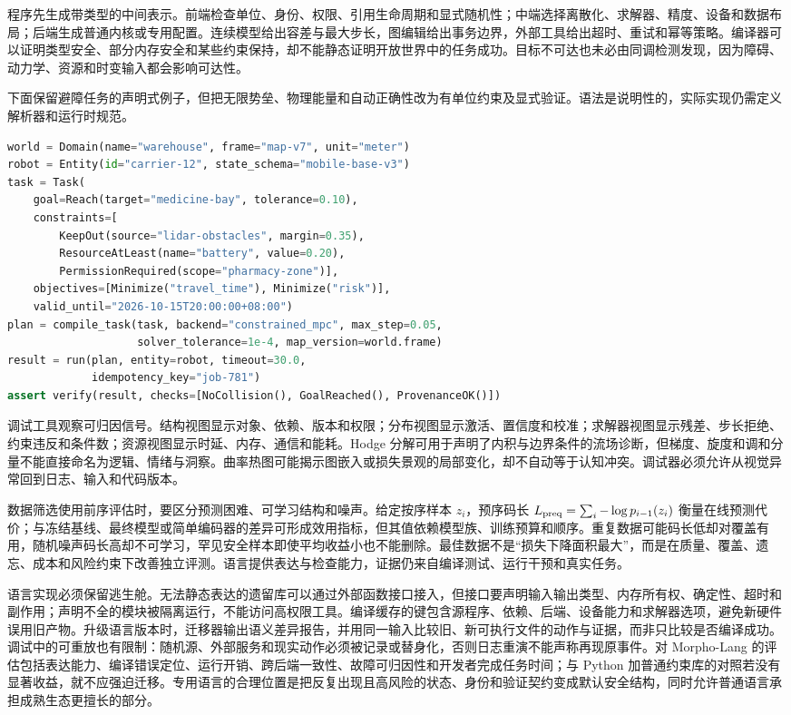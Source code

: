 程序先生成带类型的中间表示。前端检查单位、身份、权限、引用生命周期和显式随机性；中端选择离散化、求解器、精度、设备和数据布局；后端生成普通内核或专用配置。连续模型给出容差与最大步长，图编辑给出事务边界，外部工具给出超时、重试和幂等策略。编译器可以证明类型安全、部分内存安全和某些约束保持，却不能静态证明开放世界中的任务成功。目标不可达也未必由同调检测发现，因为障碍、动力学、资源和时变输入都会影响可达性。

下面保留避障任务的声明式例子，但把无限势垒、物理能量和自动正确性改为有单位约束及显式验证。语法是说明性的，实际实现仍需定义解析器和运行时规范。
\begin{lstlisting}[language=Python, caption={Morpho-Lang 参考伪代码：带版本和验证器的避障任务}]
world = Domain(name="warehouse", frame="map-v7", unit="meter")
robot = Entity(id="carrier-12", state_schema="mobile-base-v3")
task = Task(
    goal=Reach(target="medicine-bay", tolerance=0.10),
    constraints=[
        KeepOut(source="lidar-obstacles", margin=0.35),
        ResourceAtLeast(name="battery", value=0.20),
        PermissionRequired(scope="pharmacy-zone")],
    objectives=[Minimize("travel_time"), Minimize("risk")],
    valid_until="2026-10-15T20:00:00+08:00")
plan = compile_task(task, backend="constrained_mpc", max_step=0.05,
                    solver_tolerance=1e-4, map_version=world.frame)
result = run(plan, entity=robot, timeout=30.0,
             idempotency_key="job-781")
assert verify(result, checks=[NoCollision(), GoalReached(), ProvenanceOK()])
\end{lstlisting}

调试工具观察可归因信号。结构视图显示对象、依赖、版本和权限；分布视图显示激活、置信度和校准；求解器视图显示残差、步长拒绝、约束违反和条件数；资源视图显示时延、内存、通信和能耗。Hodge 分解可用于声明了内积与边界条件的流场诊断，但梯度、旋度和调和分量不能直接命名为逻辑、情绪与洞察。曲率热图可能揭示图嵌入或损失景观的局部变化，却不自动等于认知冲突。调试器必须允许从视觉异常回到日志、输入和代码版本。

数据筛选使用前序评估时，要区分预测困难、可学习结构和噪声。给定按序样本 $z_i$，预序码长 $L_{\rm preq}=\sum_i-\log p_{i-1}(z_i)$ 衡量在线预测代价；与冻结基线、最终模型或简单编码器的差异可形成效用指标，但其值依赖模型族、训练预算和顺序。重复数据可能码长低却对覆盖有用，随机噪声码长高却不可学习，罕见安全样本即使平均收益小也不能删除。最佳数据不是“损失下降面积最大”，而是在质量、覆盖、遗忘、成本和风险约束下改善独立评测。语言提供表达与检查能力，证据仍来自编译测试、运行干预和真实任务。

语言实现必须保留逃生舱。无法静态表达的遗留库可以通过外部函数接口接入，但接口要声明输入输出类型、内存所有权、确定性、超时和副作用；声明不全的模块被隔离运行，不能访问高权限工具。编译缓存的键包含源程序、依赖、后端、设备能力和求解器选项，避免新硬件误用旧产物。升级语言版本时，迁移器输出语义差异报告，并用同一输入比较旧、新可执行文件的动作与证据，而非只比较是否编译成功。调试中的可重放也有限制：随机源、外部服务和现实动作必须被记录或替身化，否则日志重演不能声称再现原事件。对 Morpho-Lang 的评估包括表达能力、编译错误定位、运行开销、跨后端一致性、故障可归因性和开发者完成任务时间；与 Python 加普通约束库的对照若没有显著收益，就不应强迫迁移。专用语言的合理位置是把反复出现且高风险的状态、身份和验证契约变成默认安全结构，同时允许普通语言承担成熟生态更擅长的部分。

